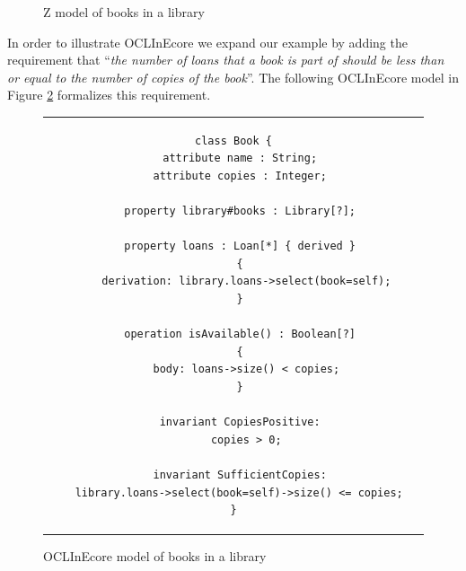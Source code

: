 \begin{figure}
\caption{Z model of books in a library}
\label{fig:book-z}
\end{figure}

%   

In order to illustrate OCLInEcore we expand our example by adding 
the requirement that ``{\em the number of loans that a book is 
part 
of should be less than or equal to the 
number of copies of the book}''. The following OCLInEcore model 
in Figure \ref{fig:book-oclinecore} formalizes this requirement.

\begin{figure}
\begin{center}
\begin{tabular}{c}
\begin{lstlisting}[language=oclinecore]
class Book {
  attribute name : String;
  attribute copies : Integer;

  property library#books : Library[?];
     
  property loans : Loan[*] { derived }
  {
    derivation: library.loans->select(book=self);
  }

  operation isAvailable() : Boolean[?]
  {
    body: loans->size() < copies;
  }
     
  invariant CopiesPositive:
    copies > 0;
     
  invariant SufficientCopies:
    library.loans->select(book=self)->size() <= copies;     
}
\end{lstlisting}
\end{tabular}
\end{center}
\caption{OCLInEcore model of books in a library}
\label{fig:book-oclinecore}
\end{figure}

